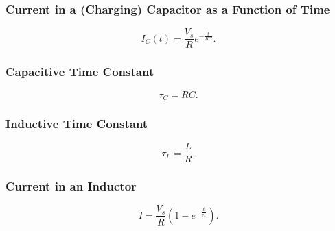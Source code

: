 \begin{symbols}
\end{symbols}

\subsubsection{Current in a (Charging) Capacitor as a Function of Time}
\begin{equation*}
  I_C(t) = \frac{V_s}{R} e^{- \frac{t}{RC}}
.\end{equation*}

\begin{symbols}
\end{symbols}

\subsubsection{Capacitive Time Constant}
\begin{equation*}
  \tau_C = RC
.\end{equation*}

\begin{symbols}
\end{symbols}

\subsubsection{Inductive Time Constant}
\begin{equation*}
  \tau_L = \frac{L}{R}
.\end{equation*}

\begin{symbols}
\end{symbols}

\subsubsection{Current in an Inductor}
\begin{equation*}
  I = \frac{V_s}{R} \left( 1 - e^{- \frac{t}{\tau_L}} \right)
.\end{equation*}

\begin{symbols}
\end{symbols}
